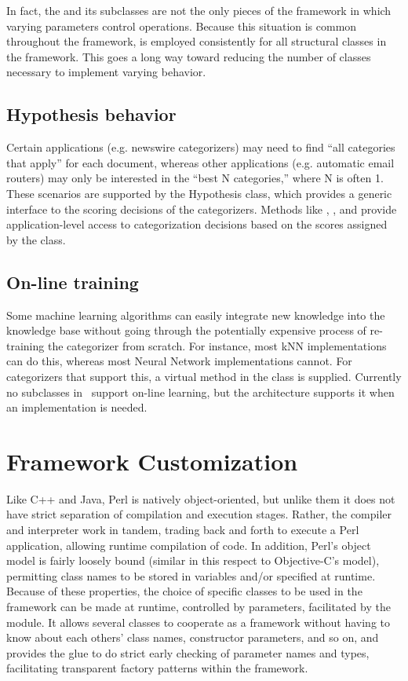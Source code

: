 \begin{singlespace}
In fact, the  and its subclasses are not the only
pieces of the framework in which varying parameters control
operations.  Because this situation is common throughout the
framework,  is employed consistently for all
structural classes in the framework.  This goes a long way toward
reducing the number of classes necessary to implement varying
behavior.

\subsection*{Hypothesis behavior}
Certain applications (e.g. newswire categorizers) may need to find
``all categories that apply'' for each document, whereas other
applications (e.g. automatic email routers) may only be interested in
the ``best N categories,'' where N is often 1.  These scenarios are
supported by the Hypothesis class, which provides a generic interface
to the scoring decisions of the categorizers.  Methods like
, , and
 provide application-level access to
categorization decisions based on the scores assigned by the
 class.

\subsection*{On-line training}
Some machine learning algorithms can easily integrate new knowledge
into the knowledge base without going through the potentially
expensive process of re-training the categorizer from scratch.  For
instance, most kNN implementations can do this, whereas most Neural
Network implementations cannot.  For categorizers that support this, a
virtual  method in the  class
is supplied.  Currently no  subclasses in
\aicat\ support on-line learning, but the
architecture supports it when an implementation is needed.


\section{Framework Customization}

Like C++ and Java, Perl is natively object-oriented, but unlike them
it does not have strict separation of compilation and execution
stages.  Rather, the compiler and interpreter work in tandem, trading
back and forth to execute a Perl application, allowing runtime
compilation of code.  In addition, Perl's object model is fairly
loosely bound (similar in this respect to Objective-C's model),
permitting class names to be stored in variables and/or specified at
runtime.  Because of these properties, the choice of specific classes
to be used in the framework can be made at runtime, controlled by
parameters, facilitated by the  module.  It
allows several classes to cooperate as a framework without having to
know about each others' class names, constructor parameters, and so
on, and provides the glue to do strict early checking of parameter
names and types, facilitating transparent factory patterns within the
framework.


\end{singlespace}
